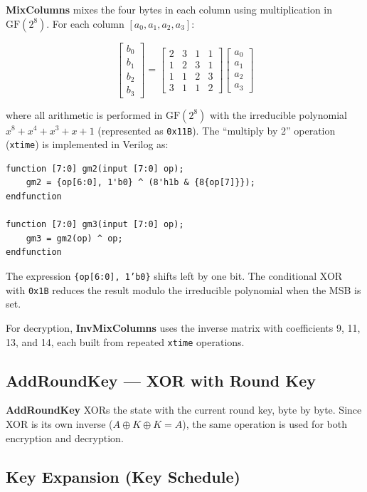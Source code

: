 \documentclass[12pt,a4paper]{article}
\begin{document}
\textbf{MixColumns} mixes the four bytes in each column using multiplication in $\text{GF}(2^8)$. For each column $[a_0, a_1, a_2, a_3]$:

\[
\begin{bmatrix} b_0 \\ b_1 \\ b_2 \\ b_3 \end{bmatrix}
=
\begin{bmatrix} 2 & 3 & 1 & 1 \\ 1 & 2 & 3 & 1 \\ 1 & 1 & 2 & 3 \\ 3 & 1 & 1 & 2 \end{bmatrix}
\begin{bmatrix} a_0 \\ a_1 \\ a_2 \\ a_3 \end{bmatrix}
\]

where all arithmetic is performed in $\text{GF}(2^8)$ with the irreducible polynomial $x^8 + x^4 + x^3 + x + 1$ (represented as \texttt{0x11B}). The ``multiply by 2'' operation (\texttt{xtime}) is implemented in Verilog as:

\begin{lstlisting}
function [7:0] gm2(input [7:0] op);
    gm2 = {op[6:0], 1'b0} ^ (8'h1b & {8{op[7]}});
endfunction

function [7:0] gm3(input [7:0] op);
    gm3 = gm2(op) ^ op;
endfunction
\end{lstlisting}

The expression \texttt{\{op[6:0], 1'b0\}} shifts left by one bit. The conditional XOR with \texttt{0x1B} reduces the result modulo the irreducible polynomial when the MSB is set.

For decryption, \textbf{InvMixColumns} uses the inverse matrix with coefficients 9, 11, 13, and 14, each built from repeated \texttt{xtime} operations.

\subsection{AddRoundKey — XOR with Round Key}

\textbf{AddRoundKey} XORs the state with the current round key, byte by byte. Since XOR is its own inverse ($A \oplus K \oplus K = A$), the same operation is used for both encryption and decryption.

\subsection{Key Expansion (Key Schedule)}
\end{document}
